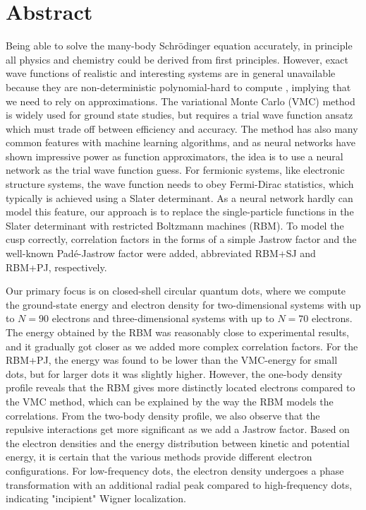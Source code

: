 \section*{Abstract}
Being able to solve the many-body Schrödinger equation accurately, in principle all physics and chemistry could be derived from first principles. However, exact wave functions of realistic and interesting systems are in general unavailable because they are non-deterministic polynomial-hard to compute \cite{troyer_computational_2005}, implying that we need to rely on approximations. The variational Monte Carlo (VMC) method is widely used for ground state studies, but requires a trial wave function ansatz which must trade off between efficiency and accuracy. The method has also many common features with machine learning algorithms, and as neural networks have shown impressive power as function approximators, the idea is to use a neural network as the trial wave function guess. For fermionic systems, like electronic structure systems, the wave function needs to obey Fermi-Dirac statistics, which typically is achieved using a Slater determinant. As a neural network hardly can model this feature, our approach is to replace the single-particle functions in the Slater determinant with restricted Boltzmann machines (RBM). To model the cusp correctly, correlation factors in the forms of a simple Jastrow factor and the well-known Padé-Jastrow factor were added, abbreviated RBM+SJ and RBM+PJ, respectively.

Our primary focus is on closed-shell circular quantum dots, where we compute the ground-state energy and electron density for two-dimensional systems with up to $N=90$ electrons and three-dimensional systems with up to $N=70$ electrons. The energy obtained by the RBM was reasonably close to experimental results, and it gradually got closer as we added more complex correlation factors. For the RBM+PJ, the energy was found to be lower than the VMC-energy for small dots, but for larger dots it was slightly higher. However, the one-body density profile reveals that the RBM gives more distinctly located electrons compared to the VMC method, which can be explained by the way the RBM models the correlations. From the two-body density profile, we also observe that the repulsive interactions get more significant as we add a Jastrow factor. Based on the electron densities and the energy distribution between kinetic and potential energy, it is certain that the various methods provide different electron configurations. For low-frequency dots, the electron density undergoes a phase transformation with an additional radial peak compared to high-frequency dots, indicating "incipient" Wigner localization.

